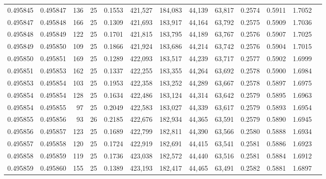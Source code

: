 \begin{tabular}{rrrrrrrrrrrrr}
0.495845 & 0.495847 &   136 &  25 &                                     0.1553 & 421,527 & 184,083 &  44,139 &  63,817 & 0.2574 & 0.5911 & 1.7052 \\
0.495847 & 0.495848 &   166 &  25 &                                     0.1309 & 421,693 & 183,917 &  44,164 &  63,792 & 0.2575 & 0.5909 & 1.7036 \\
0.495848 & 0.495849 &   122 &  25 &                                     0.1701 & 421,815 & 183,795 &  44,189 &  63,767 & 0.2576 & 0.5907 & 1.7025 \\
0.495849 & 0.495850 &   109 &  25 &                                     0.1866 & 421,924 & 183,686 &  44,214 &  63,742 & 0.2576 & 0.5904 & 1.7015 \\
0.495850 & 0.495851 &   169 &  25 &                                     0.1289 & 422,093 & 183,517 &  44,239 &  63,717 & 0.2577 & 0.5902 & 1.6999 \\
0.495851 & 0.495853 &   162 &  25 &                                     0.1337 & 422,255 & 183,355 &  44,264 &  63,692 & 0.2578 & 0.5900 & 1.6984 \\
0.495853 & 0.495854 &   103 &  25 &                                     0.1953 & 422,358 & 183,252 &  44,289 &  63,667 & 0.2578 & 0.5897 & 1.6975 \\
0.495854 & 0.495854 &   128 &  25 &                                     0.1634 & 422,486 & 183,124 &  44,314 &  63,642 & 0.2579 & 0.5895 & 1.6963 \\
0.495854 & 0.495855 &    97 &  25 &                                     0.2049 & 422,583 & 183,027 &  44,339 &  63,617 & 0.2579 & 0.5893 & 1.6954 \\
0.495855 & 0.495856 &    93 &  26 &                                     0.2185 & 422,676 & 182,934 &  44,365 &  63,591 & 0.2579 & 0.5890 & 1.6945 \\
0.495856 & 0.495857 &   123 &  25 &                                     0.1689 & 422,799 & 182,811 &  44,390 &  63,566 & 0.2580 & 0.5888 & 1.6934 \\
0.495857 & 0.495858 &   120 &  25 &                                     0.1724 & 422,919 & 182,691 &  44,415 &  63,541 & 0.2581 & 0.5886 & 1.6923 \\
0.495858 & 0.495859 &   119 &  25 &                                     0.1736 & 423,038 & 182,572 &  44,440 &  63,516 & 0.2581 & 0.5884 & 1.6912 \\
0.495859 & 0.495860 &   155 &  25 &                                     0.1389 & 423,193 & 182,417 &  44,465 &  63,491 & 0.2582 & 0.5881 & 1.6897 \\

\end{tabular}
